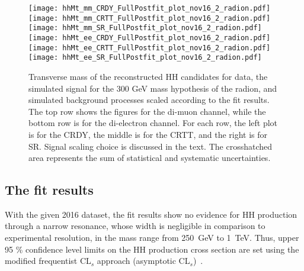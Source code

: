 \begin{figure}[H]
  \begin{center}
    \texttt{[image: hhMt\_mm\_CRDY\_FullPostfit\_plot\_nov16\_2\_radion.pdf]}
    \texttt{[image: hhMt\_mm\_CRTT\_FullPostfit\_plot\_nov16\_2\_radion.pdf]}
    \texttt{[image: hhMt\_mm\_SR\_FullPostfit\_plot\_nov16\_2\_radion.pdf]} \\
    \texttt{[image: hhMt\_ee\_CRDY\_FullPostfit\_plot\_nov16\_2\_radion.pdf]}
    \texttt{[image: hhMt\_ee\_CRTT\_FullPostfit\_plot\_nov16\_2\_radion.pdf]}
    \texttt{[image: hhMt\_ee\_SR\_FullPostfit\_plot\_nov16\_2\_radion.pdf]}
    \caption[Transverse mass of the reconstructed HH candidates for graviton hypothesis.]{Transverse mass of the reconstructed HH candidates for data, the simulated signal for the 300 GeV mass hypothesis of the radion, and simulated background processes scaled according to the fit results. The top row shows the figures for the di-muon channel, while the bottom row is for the di-electron channel. For each row, the left plot is for the CRDY, the middle is for the CRTT, and the right is for SR. Signal scaling choice is discussed in the text. The crosshatched area represents the sum of statistical and systematic uncertainties.}
    \label{fig:MCcomparisons_radion}                                                                            
  \end{center}
\end{figure}























\subsection{The fit results}
\label{sec:fit_results}

With the given 2016 dataset, the fit results show no evidence for HH production through a narrow
resonance, whose width is negligible in comparison to experimental
resolution, in the mass range from 250~GeV to 1~TeV. Thus, upper 95 \% confidence level limits on the
HH production cross section are set using the modified
frequentist CL$_s$ approach (asymptotic CL$_s$)~\cite{Junk:1999kv,LEP-CLs, HIG-11-011, Cowan:2010js}.

